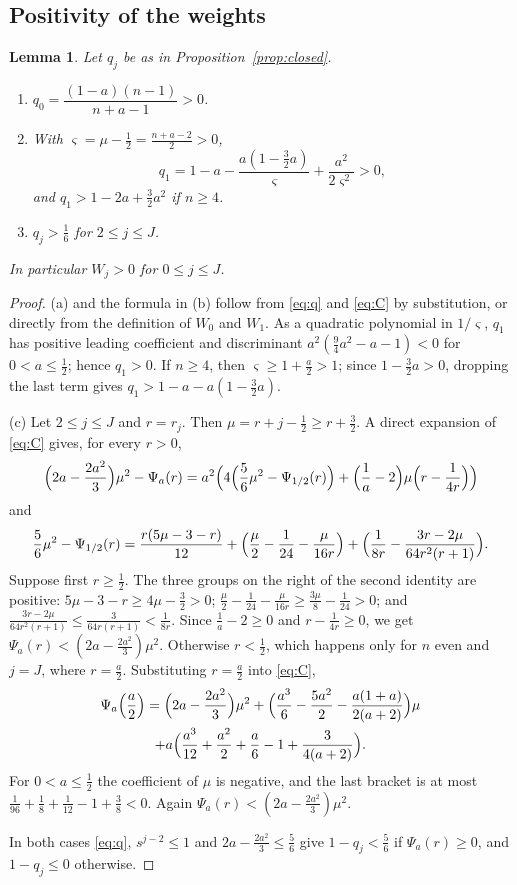 \documentclass[11pt]{amsart}
\newtheorem{lemma}[theorem]{Lemma}
\theoremstyle{definition}
\theoremstyle{remark}
\numberwithin{equation}{section}
\begin{document}
\subsection{Positivity of the weights}

\begin{lemma}\label{lem:positivity}
Let $q_j$ be as in Proposition~\textup{\ref{prop:closed}}.
\begin{enumerate}[label=\textup{(\alph*)}]
\item $q_0=\dfrac{(1-a)(n-1)}{n+a-1}>0$.
\item With $\varsigma=\mu-\frac12=\frac{n+a-2}2>0$,
\[
q_1=1-a-\frac{a(1-\frac32a)}{\varsigma}+\frac{a^2}{2\varsigma^2}>0,
\]
and $q_1>1-2a+\frac32a^2$ if $n\ge4$.
\item $q_j>\frac16$ for $2\le j\le J$.
\end{enumerate}
In particular $W_j>0$ for $0\le j\le J$.
\end{lemma}

\begin{proof}
(a) and the formula in (b) follow from \eqref{eq:q} and \eqref{eq:C} by substitution, or directly from the definition of $W_0$ and $W_1$. As a quadratic polynomial in $1/\varsigma$, $q_1$ has positive leading coefficient and discriminant $a^2(\frac94a^2-a-1)<0$ for $0<a\le\frac12$; hence $q_1>0$. If $n\ge4$, then $\varsigma\ge1+\frac a2>1$; since $1-\frac32a>0$, dropping the last term gives $q_1>1-a-a(1-\frac32a)$.

(c) Let $2\le j\le J$ and $r=r_j$. Then $\mu=r+j-\frac12\ge r+\frac32$. A direct expansion of \eqref{eq:C} gives, for every $r>0$,
\[
\Bigl(2a-\frac{2a^2}3\Bigr)\mu^2-\Psi_a(r)=a^2\Bigl(4\Bigl(\frac56\mu^2-\Psi_{1/2}(r)\Bigr)+\Bigl(\frac1a-2\Bigr)\mu\Bigl(r-\frac1{4r}\Bigr)\Bigr)
\]
and
\[
\frac56\mu^2-\Psi_{1/2}(r)=\frac{r(5\mu-3-r)}{12}+\Bigl(\frac\mu2-\frac1{24}-\frac{\mu}{16r}\Bigr)
+\Bigl(\frac1{8r}-\frac{3r-2\mu}{64r^2(r+1)}\Bigr).
\]
Suppose first $r\ge\frac12$. The three groups on the right of the second identity are positive: $5\mu-3-r\ge4\mu-\frac32>0$; $\frac\mu2-\frac1{24}-\frac\mu{16r}\ge\frac{3\mu}8-\frac1{24}>0$; and $\frac{3r-2\mu}{64r^2(r+1)}\le\frac{3}{64r(r+1)}<\frac1{8r}$. Since $\frac1a-2\ge0$ and $r-\frac1{4r}\ge0$, we get $\Psi_a(r)<(2a-\frac{2a^2}3)\mu^2$. Otherwise $r<\frac12$, which happens only for $n$ even and $j=J$, where $r=\frac a2$. Substituting $r=\frac a2$ into \eqref{eq:C},
\begin{multline*}
\Psi_a\Bigl(\frac a2\Bigr)=\Bigl(2a-\frac{2a^2}3\Bigr)\mu^2+\Bigl(\frac{a^3}6-\frac{5a^2}2-\frac{a(1+a)}{2(a+2)}\Bigr)\mu\\
+a\Bigl(\frac{a^3}{12}+\frac{a^2}2+\frac a6-1+\frac{3}{4(a+2)}\Bigr).
\end{multline*}
For $0<a\le\frac12$ the coefficient of $\mu$ is negative, and the last bracket is at most $\frac1{96}+\frac18+\frac1{12}-1+\frac38<0$. Again $\Psi_a(r)<(2a-\frac{2a^2}3)\mu^2$.

In both cases \eqref{eq:q}, $s^{j-2}\le1$ and $2a-\frac{2a^2}3\le\frac56$ give $1-q_j<\frac56$ if $\Psi_a(r)\ge0$, and $1-q_j\le0$ otherwise.
\end{proof}
\end{document}
